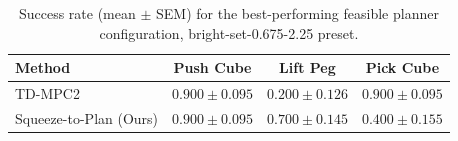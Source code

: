 \begin{table}[t]
\centering
\begin{tabular}{lccc}
\toprule
Method & Push Cube & Lift Peg & Pick Cube \\
\midrule
TD-MPC2 & $0.900 \pm 0.095$ & $0.200 \pm 0.126$ & $0.900 \pm 0.095$ \\
Squeeze-to-Plan (Ours) & $0.900 \pm 0.095$ & $0.700 \pm 0.145$ & $0.400 \pm 0.155$ \\
\bottomrule
\end{tabular}
\caption{Success rate (mean $\pm$ SEM) for the best-performing feasible planner configuration, bright-set-0.675-2.25 preset.}
\label{tab:latency_vs_success_rate_bright-set-0.675-2.25}
\end{table}
